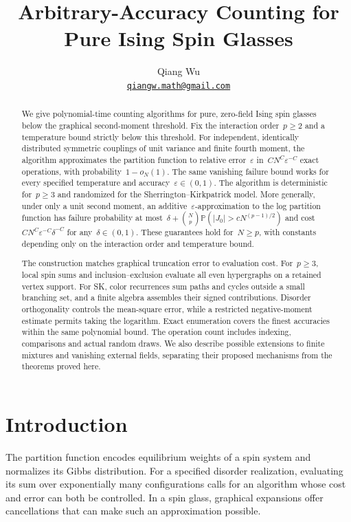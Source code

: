 \documentclass[10pt]{article}
\title{Arbitrary-Accuracy Counting for\\Pure Ising Spin Glasses}
\author{Qiang Wu\\{\normalsize\href{mailto:qiangw.math@gmail.com}{\texttt{qiangw.math@gmail.com}}}}
\date{}
\theoremstyle{plain}
\theoremstyle{definition}
\theoremstyle{remark}
\begin{document}
\maketitle
\begin{abstract}
We give polynomial-time counting algorithms for pure, zero-field Ising spin glasses below the graphical second-moment threshold. Fix the interaction order~$p\ge2$ and a temperature bound strictly below this threshold. For independent, identically distributed symmetric couplings of unit variance and finite fourth moment, the algorithm approximates the partition function to relative error~$\varepsilon$ in~$CN^C\varepsilon^{-C}$ exact operations, with probability~$1-o_N(1)$. The same vanishing failure bound works for every specified temperature and accuracy~$\varepsilon\in(0,1)$. The algorithm is deterministic for~$p\ge3$ and randomized for the Sherrington--Kirkpatrick model. More generally, under only a unit second moment, an additive~$\varepsilon$-approximation to the log partition function has failure probability at most~$\delta+\binom Np\mathbb P(|J_0|>cN^{(p-1)/2})$ and cost~$CN^C\varepsilon^{-C}\delta^{-C}$ for any~$\delta\in(0,1)$. These guarantees hold for~$N\ge p$, with constants depending only on the interaction order and temperature bound.

The construction matches graphical truncation error to evaluation cost. For~$p\ge3$, local spin sums and inclusion--exclusion evaluate all even hypergraphs on a retained vertex support. For SK, color recurrences sum paths and cycles outside a small branching set, and a finite algebra assembles their signed contributions. Disorder orthogonality controls the mean-square error, while a restricted negative-moment estimate permits taking the logarithm. Exact enumeration covers the finest accuracies within the same polynomial bound. The operation count includes indexing, comparisons and actual random draws. We also describe possible extensions to finite mixtures and vanishing external fields, separating their proposed mechanisms from the theorems proved here.
\end{abstract}

\clearpage
\tableofcontents
\clearpage
\section{Introduction}\label{sec:introduction}
The partition function encodes equilibrium weights of a spin system and normalizes its Gibbs distribution. For a specified disorder realization, evaluating its sum over exponentially many configurations calls for an algorithm whose cost and error can both be controlled. In a spin glass, graphical expansions offer cancellations that can make such an approximation possible.
\end{document}
